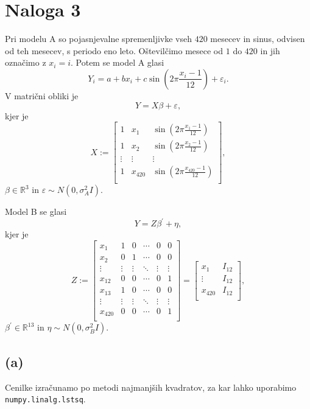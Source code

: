 \documentclass{article}
\begin{document}
\section*{Naloga 3}
Pri modelu A so pojasnjevalne spremenljivke vseh $420$ mesecev in sinus, odvisen od teh mesecev, s periodo eno leto. Oštevilčimo mesece od $1$ do $420$ in jih označimo z $x_i = i$. Potem se model A glasi
\begin{equation*}
    Y_i = a + b x_i + c \sin \left(2\pi \frac{x_i - 1}{12}\right) + \varepsilon_i.
\end{equation*}
V matrični obliki je
\begin{equation*}
    Y = X \beta + \varepsilon,
\end{equation*}
kjer je
\begin{equation*}
    X := 
    \begin{bmatrix}
        1 & x_1 & \sin \left(2\pi \frac{x_1 - 1}{12}\right) \\
        1 & x_2 & \sin \left(2\pi \frac{x_2 - 1}{12}\right) \\
        \vdots & \vdots & \vdots \\
        1 & x_{420} & \sin \left(2\pi \frac{x_{420} - 1}{12}\right) \\
    \end{bmatrix},
\end{equation*}
$\beta \in \mathbb{R}^3$ in $\varepsilon \sim N \left(0, \sigma_A^2 I\right)$.

Model B se glasi
\begin{equation*}
    Y = Z \beta^\prime + \eta,
\end{equation*}
kjer je
\begin{equation*}
    Z :=
    \begin{bmatrix}
        x_1 & 1 & 0 & \cdots & 0 & 0 \\
        x_2 & 0 & 1 & \cdots & 0 & 0 \\
        \vdots & \vdots & \vdots & \ddots & \vdots & \vdots \\
        x_{12} & 0 & 0 & \cdots & 0 & 1 \\
        x_{13} & 1 & 0 & \cdots & 0 & 0 \\
        \vdots & \vdots & \vdots & \ddots & \vdots & \vdots \\
        x_{420} & 0 & 0 & \cdots & 0 & 1 \\
    \end{bmatrix}
    =
    \begin{bmatrix}
        x_1  & I_{12} \\
        \vdots &I_{12} \\
        x_{420}  & I_{12} \\
    \end{bmatrix},
\end{equation*}
$\beta^\prime \in \mathbb{R}^{13}$ in $\eta \sim N\left(0, \sigma_B^2 I\right)$.

\subsection*{(a)}
Cenilke izračunamo po metodi najmanjših kvadratov, za kar lahko uporabimo \texttt{numpy.linalg.lstsq}.
\end{document}
